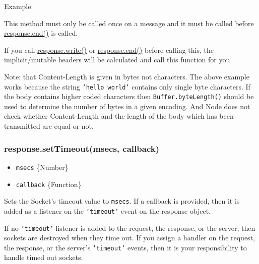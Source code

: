 Example:

\begin{Shaded}
\begin{Highlighting}[]
 \NormalTok{;}
\NormalTok{(}\NormalTok{, \{}
  \NormalTok{: }\NormalTok{,}
  \NormalTok{: } \NormalTok{\});}
\end{Highlighting}
\end{Shaded}

This method must only be called once on a message and it must be called
before
\hyperref[httpux5fresponseux5fendux5fdataux5fencoding]{response.end()}
is called.

If you call
\hyperref[httpux5fresponseux5fwriteux5fchunkux5fencoding]{response.write()}
or
\hyperref[httpux5fresponseux5fendux5fdataux5fencoding]{response.end()}
before calling this, the implicit/mutable headers will be calculated and
call this function for you.

Note: that Content-Length is given in bytes not characters. The above
example works because the string \texttt{'hello world'} contains only
single byte characters. If the body contains higher coded characters
then \texttt{Buffer.byteLength()} should be used to determine the number
of bytes in a given encoding. And Node does not check whether
Content-Length and the length of the body which has been transmitted are
equal or not.

\subsubsection{response.setTimeout(msecs,
callback)}\label{response.settimeoutmsecs-callback}

\begin{itemize}
\itemsep1pt\parskip0pt
\item
  \texttt{msecs} \{Number\}
\item
  \texttt{callback} \{Function\}
\end{itemize}

Sets the Socket's timeout value to \texttt{msecs}. If a callback is
provided, then it is added as a listener on the \texttt{'timeout'} event
on the response object.

If no \texttt{'timeout'} listener is added to the request, the response,
or the server, then sockets are destroyed when they time out. If you
assign a handler on the request, the response, or the server's
\texttt{'timeout'} events, then it is your responsibility to handle
timed out sockets.

